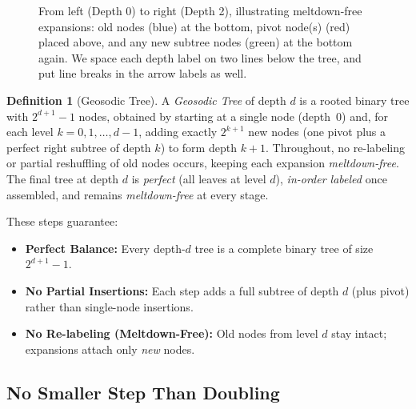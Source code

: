 \documentclass[11pt]{article}
\theoremstyle{definition}
\newtheorem{definition}[theorem]{Definition}
\theoremstyle{remark}
\begin{document}
\begin{figure}[ht]
  
  \caption{From left (Depth 0) to right (Depth 2), illustrating meltdown-free expansions:
  old nodes (blue) at the bottom, pivot node(s) (red) placed above,
  and any new subtree nodes (green) at the bottom again. 
  We space each depth label on two lines below the tree, 
  and put line breaks in the arrow labels as well.}
  \label{fig:geosodic-expansion}
  \end{figure}
   
\begin{definition}[Geosodic Tree]
\label{def:geosodic-tree}
A \emph{Geosodic Tree} of depth $d$ is a rooted binary tree with $2^{d+1}-1$ nodes,
obtained by starting at a single node (depth~0) and, for each level $k=0,1,\dots,d-1$, 
adding exactly $2^{k+1}$ new nodes (one pivot plus a perfect right subtree of depth $k$) 
to form depth $k+1$. Throughout, no re-labeling or partial reshuffling of old nodes occurs,
keeping each expansion \emph{meltdown-free}. The final tree at depth $d$ is \emph{perfect} 
(all leaves at level $d$), \emph{in-order labeled} once assembled, and remains 
\emph{meltdown-free} at every stage.
\end{definition}

These steps guarantee:
\begin{itemize}
  \item \textbf{Perfect Balance:} Every depth-$d$ tree is a complete binary tree of size $2^{d+1}-1$.
  \item \textbf{No Partial Insertions:} Each step adds a full subtree of depth $d$ (plus pivot) 
        rather than single-node insertions.
  \item \textbf{No Re-labeling (Meltdown-Free):} Old nodes from level $d$ stay intact; 
        expansions attach only \emph{new} nodes.
\end{itemize}

\subsection{No Smaller Step Than Doubling}
\label{subsec:no-smaller}
\end{document}
